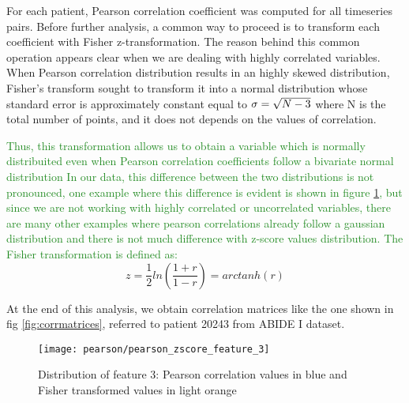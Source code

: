 \documentclass[11pt]{report}
\begin{document}
For each patient, Pearson correlation coefficient was computed for all timeseries pairs.
Before further analysis, a common way to proceed is to transform each coefficient with Fisher z-transformation.\cite{spera-2019}
The reason behind this common operation appears clear when we are dealing with highly correlated variables.
When Pearson correlation distribution results in an highly skewed distribution, Fisher's transform sought to transform it into a normal distribution whose standard error is approximately constant equal to $\sigma = \/\sqrt{N-3}$ where N is the total number of points, and it does not depends on the values of correlation.\cite{wicklin2017}

\textcolor{ForestGreen}{
Thus, this transformation allows us to obtain a variable which is normally distribuited even when Pearson correlation coefficients follow a bivariate normal distribution
In our data, this difference between the two distributions is not pronounced, one example where this difference is evident is shown in figure \ref{fig:pearson_zscore_distribution_3}, but since we are not working with highly correlated or uncorrelated variables, there are many other examples where pearson correlations already follow a gaussian distribution and there is not much difference with z-score values distribution.
The Fisher transformation is defined as:
}
\begin{equation}
z = \frac{1}{2}ln\left(\frac{1+r}{1-r}\right) = arctanh(r)
\end{equation}

At the end of this analysis, we obtain correlation matrices like the one shown in fig \ref{fig:corrmatrices}, referred to patient 20243 from ABIDE I dataset.


\begin{figure}[h!]
\centering
\texttt{[image: pearson/pearson\_zscore\_feature\_3]}
\caption{Distribution of feature 3: Pearson correlation values in blue and Fisher transformed values in light orange}
\label{fig:pearson_zscore_distribution_3}
\end{figure}
\end{document}
